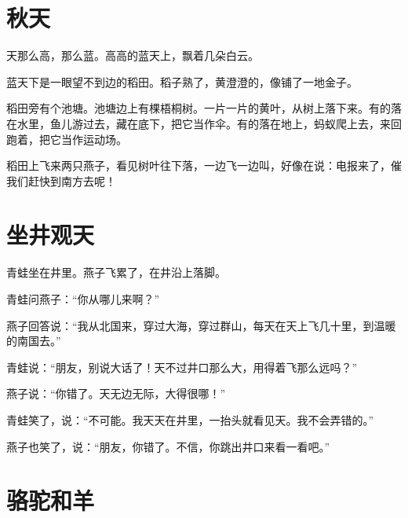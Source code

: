 \documentclass[12pt,UTF-8,openany]{ctexbook}
\begin{document}
\chapter{秋天}

\begin{large}
    
    天那么高，那么蓝。高高的蓝天上，飘着几朵白云。
    
    蓝天下是一眼望不到边的稻田。稻子熟了，黄澄澄的，像铺了一地金子。
    
    稻田旁有个池塘。池塘边上有棵梧桐树。一片一片的黄叶，从树上落下来。有的落在水里，鱼儿游过去，藏在底下，把它当作伞。有的落在地上，蚂蚁爬上去，来回跑着，把它当作运动场。
    
    稻田上飞来两只燕子，看见树叶往下落，一边飞一边叫，好像在说：电报来了，催我们赶快到南方去呢！
    
\end{large}



\chapter{坐井观天}

\begin{large}
    
    青蛙坐在井里。燕子飞累了，在井沿上落脚。
    
    青蛙问燕子：“你从哪儿来啊？”
    
    燕子回答说：“我从北国来，穿过大海，穿过群山，每天在天上飞几十里，到温暖的南国去。”
    
    青蛙说：“朋友，别说大话了！天不过井口那么大，用得着飞那么远吗？”
    
    燕子说：“你错了。天无边无际，大得很哪！”
    
    青蛙笑了，说：“不可能。我天天在井里，一抬头就看见天。我不会弄错的。”
    
    燕子也笑了，说：“朋友，你错了。不信，你跳出井口来看一看吧。”
    
\end{large}



\chapter{骆驼和羊}
\end{document}
